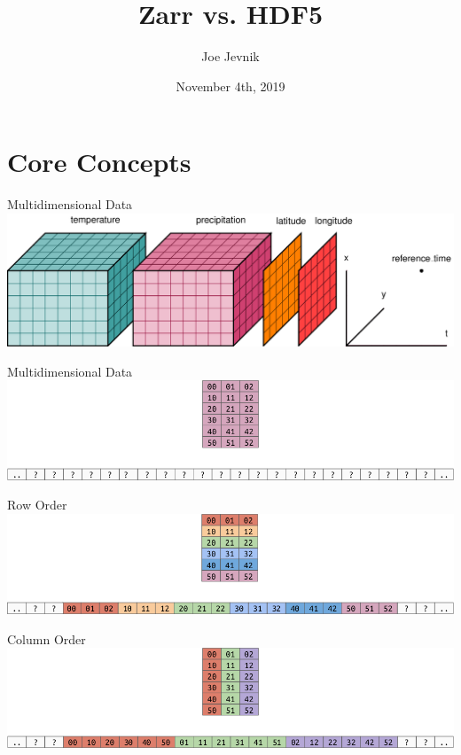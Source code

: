\documentclass{beamer}
\title{Zarr vs. HDF5}
\date{November 4th, 2019}
\author{Joe Jevnik}
\institute{PyData NYC 2019}
\begin{document}
\maketitle

\newcommand{\zarr}{\texttt{zarr}}

\section{Core Concepts}

\begin{frame}{Multidimensional Data}
  \includegraphics[width=1.00\textwidth]{images/multidimensional-data.png}
\end{frame}

\begin{frame}{Multidimensional Data}
  \includegraphics[width=1.00\textwidth]{images/2d-array.png}
\end{frame}

\begin{frame}{Row Order}
  \includegraphics[width=1.00\textwidth]{images/row-order.png}
\end{frame}

\begin{frame}{Column Order}
  \includegraphics[width=1.00\textwidth]{images/column-order.png}
\end{frame}
\end{document}
